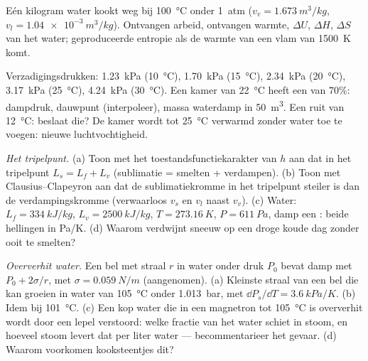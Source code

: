 \begin{exercise}[$\star\star$]\label{exo:b1:phase-changes:8}
Eén kilogram water kookt weg bij \qty{100}{\degreeCelsius} onder
\qty{1}{atm} ($v_v = \qty{1.673}{m^3/kg}$, $v_l = \qty{1.04e-3}{m^3/kg}$).
Ontvangen arbeid, ontvangen warmte, $\Delta U$, $\Delta H$, $\Delta S$ van het
water; geproduceerde entropie als de warmte van een vlam van
\qty{1500}{K} komt.
\end{exercise}

\begin{exercise}[$\star\star$]\label{exo:b1:phase-changes:9}
Verzadigingsdrukken: \qty{1.23}{kPa} (\qty{10}{\degreeCelsius}), \qty{1.70}{kPa}
(\qty{15}{\degreeCelsius}), \qty{2.34}{kPa} (\qty{20}{\degreeCelsius}), \qty{3.17}{kPa}
(\qty{25}{\degreeCelsius}), \qty{4.24}{kPa} (\qty{30}{\degreeCelsius}). Een kamer
van \qty{22}{\degreeCelsius} heeft een  van $70\%$: dampdruk,
dauwpunt (interpoleer), massa waterdamp in
\qty{50}{m^3}. Een ruit van \qty{12}{\degreeCelsius}: beslaat die?
De kamer wordt tot \qty{25}{\degreeCelsius} verwarmd zonder water toe te voegen: nieuwe
luchtvochtigheid.
\end{exercise}

\begin{exercise}[$\star\star\star$]\label{exo:b1:phase-changes:10}
\emph{Het tripelpunt.} (a) Toon met het toestandsfunctiekarakter van
$h$ aan dat in het tripelpunt $L_s = L_f + L_v$ (sublimatie = smelten +
verdampen). (b) Toon met Clausius--Clapeyron aan dat de sublimatiekromme
in het tripelpunt steiler is dan de verdampingskromme
(verwaarloos $v_s$ en $v_l$ naast $v_v$). (c) Water: $L_f = \qty{334}{kJ/kg}$,
$L_v = \qty{2500}{kJ/kg}$, $T = \qty{273.16}{K}$, $P = \qty{611}{Pa}$, damp een
: beide hellingen in \unit{Pa/K}. (d) Waarom verdwijnt sneeuw
op een droge koude dag zonder ooit te smelten?
\end{exercise}

\begin{exercise}[$\star\star\star$]\label{exo:b1:phase-changes:11}
\emph{Oververhit water.} Een bel met straal $r$ in water onder druk
$P_0$ bevat damp met $P_0 + 2\sigma/r$, met $\sigma = \qty{0.059}{N/m}$
(aangenomen). (a) Kleinste straal van een bel die kan groeien in water van
\qty{105}{\degreeCelsius} onder \qty{1.013}{bar}, met
$\dd P_s/\dd T = \qty{3.6}{kPa/K}$. (b) Idem bij \qty{101}{\degreeCelsius}.
(c) Een kop water die in een magnetron tot \qty{105}{\degreeCelsius} is
oververhit wordt door een lepel verstoord: welke fractie van het water schiet in
stoom, en hoeveel stoom levert dat per liter water --- becommentarieer
het gevaar. (d) Waarom voorkomen kooksteentjes dit?
\end{exercise}


